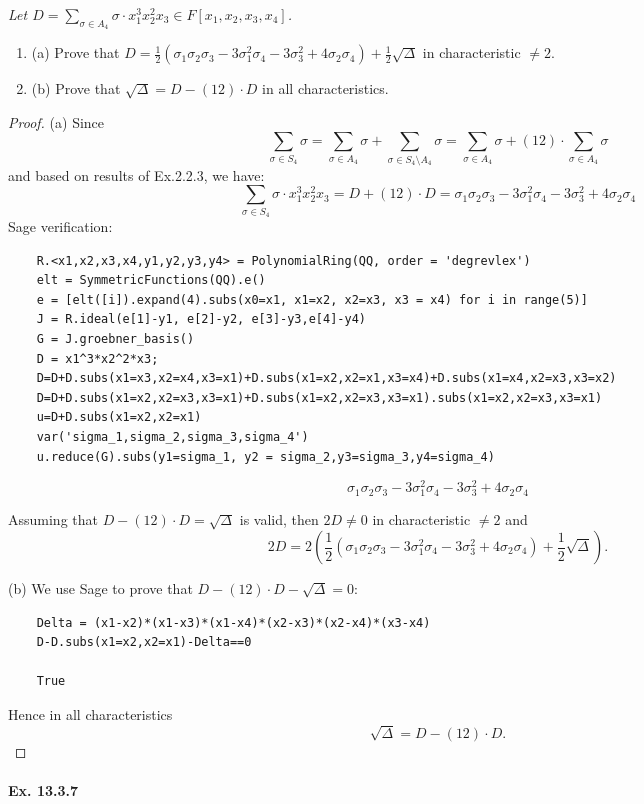 \documentclass[11pt,a4paper]{article}
\newcommand{\be} {\begin{enumerate}}
\newcommand{\ee} {\end{enumerate}}
\begin{document}
{\it Let $D=\sum_{\sigma \in A_4} \sigma \cdot x_1^3x_2^2x_3 \in F[x_1,x_2,x_3,x_4]$.
\be
\item[(a)] Prove that $D=\frac{1}{2}(\sigma_1\sigma_2\sigma_3 -3 \sigma_1^2 \sigma_4 -3\sigma_3^2 + 4\sigma_2 \sigma_4)+\frac{1}{2}\sqrt{\Delta}$ in characteristic $\ne 2$.
\item[(b)] Prove that $\sqrt{\Delta}=D-(12)\cdot D$ in all characteristics.
\ee
\begin{proof}
\item[(a)] Since $$\sum_{\sigma \in S_4} \sigma =\sum_{\sigma \in A_4} \sigma + \sum_{\sigma \in S_4 \setminus A_4} \sigma =\sum_{\sigma \in A_4} \sigma + (12)\cdot \sum_{\sigma \in  A_4} \sigma $$ and based on results of Ex.2.2.3, we have:
$$\sum_{\sigma \in S_4} \sigma \cdot x_1^3x_2^2x_3 = D+(12)\cdot D =\sigma_1\sigma_2\sigma_3 -3 \sigma_1^2 \sigma_4 -3\sigma_3^2 + 4\sigma_2 \sigma_4 $$
Sage verification:
\begin{verbatim}
    R.<x1,x2,x3,x4,y1,y2,y3,y4> = PolynomialRing(QQ, order = 'degrevlex')
    elt = SymmetricFunctions(QQ).e()
    e = [elt([i]).expand(4).subs(x0=x1, x1=x2, x2=x3, x3 = x4) for i in range(5)]
    J = R.ideal(e[1]-y1, e[2]-y2, e[3]-y3,e[4]-y4)
    G = J.groebner_basis()
    D = x1^3*x2^2*x3;
    D=D+D.subs(x1=x3,x2=x4,x3=x1)+D.subs(x1=x2,x2=x1,x3=x4)+D.subs(x1=x4,x2=x3,x3=x2)
    D=D+D.subs(x1=x2,x2=x3,x3=x1)+D.subs(x1=x2,x2=x3,x3=x1).subs(x1=x2,x2=x3,x3=x1)
    u=D+D.subs(x1=x2,x2=x1)
    var('sigma_1,sigma_2,sigma_3,sigma_4')
    u.reduce(G).subs(y1=sigma_1, y2 = sigma_2,y3=sigma_3,y4=sigma_4)
\end{verbatim}
$$\sigma_1\sigma_2\sigma_3 -3 \sigma_1^2 \sigma_4 -3\sigma_3^2 + 4\sigma_2 \sigma_4 $$

Assuming that $D-(12)\cdot D=\sqrt{\Delta}$ is valid, then $2D \ne 0$ in characteristic $\ne 2$ and
$$2D=2(\frac{1}{2}(\sigma_1\sigma_2\sigma_3 -3 \sigma_1^2 \sigma_4 -3\sigma_3^2 + 4\sigma_2 \sigma_4)+\frac{1}{2}\sqrt{\Delta}).$$
\item[(b)] We use Sage to prove that $D-(12)\cdot D-\sqrt{\Delta}=0$:

\begin{verbatim}
    Delta = (x1-x2)*(x1-x3)*(x1-x4)*(x2-x3)*(x2-x4)*(x3-x4)
    D-D.subs(x1=x2,x2=x1)-Delta==0
    
    True
\end{verbatim}
Hence in all characteristics  $$\sqrt{\Delta}=D-(12)\cdot D.$$
\end{proof}
}

\paragraph{Ex. 13.3.7}
\end{document}
